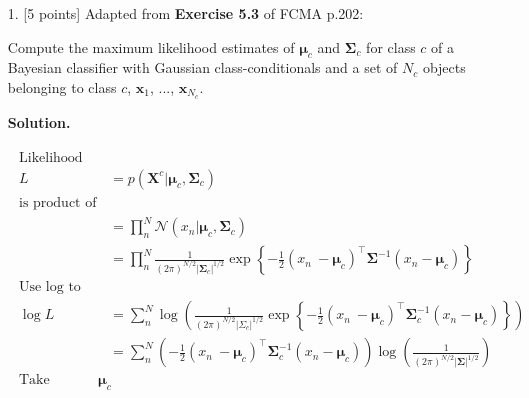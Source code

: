 \documentclass[10pt]{article}
\begin{document}
\newpage
\begin{itemize}

\item[1.]  [5 points]  %
Adapted from {\bf Exercise 5.3} of FCMA p.202:

Compute the maximum likelihood estimates of $\boldsymbol{\mu}_c$ and $\boldsymbol{\Sigma}_c$ for class $c$ of a Bayesian classifier with Gaussian class-conditionals and a set of $N_c$ objects belonging to class $c$, $\mathbf{x}_1$, ..., $\mathbf{x}_{N_c}$. 

{\bf Solution.} 

\begin{eqnarray*}
\begin{aligned}
\text{Likelihood}
\\
L &= p(\mathbf{X}^c|\boldsymbol{\mu}_c, \boldsymbol{\Sigma}_c)
\\
\text{is product of (Gaussian) probabilities}
\\
&= \prod_n^N \mathcal{N} (x_n|\boldsymbol{\mu}_c, \boldsymbol{\Sigma}_c)
\\
&= \prod_n^N 
\frac{1}{(2 \pi)^{N/2} | \boldsymbol {\Sigma}_c |^{1/2}} 
\exp 
\left\{ 
-\frac{1}{2} (x_n\ - \boldsymbol {\mu}_c)^\top \boldsymbol \Sigma^{-1} (x_n - \boldsymbol {\mu}_c)
\right\}
\\
\text{Use log to handle product}
\\
\log L &= \sum_n^N 
\log \left(
\frac{1}{(2 \pi)^{N/2} | {\Sigma}_c |^{1/2}} 
\exp 
\left\{ -\frac{1}{2} (x_n\ - \boldsymbol {\mu}_c)^\top \boldsymbol {\Sigma}_c^{-1} (x_n - \boldsymbol {\mu}_c) \right\}
\right)
\\
&= \sum_n^N
\left( -\frac{1}{2} (x_n\ - \boldsymbol {\mu}_c)^\top \boldsymbol {\Sigma}_c^{-1} (x_n - \boldsymbol {\mu}_c) \right)
\log \left( \frac{1}{(2 \pi)^{N/2} | \boldsymbol \Sigma |^{1/2}} \right)
\\
\text{Take derivative w.r.t. $\boldsymbol \mu_c$}
\\

\end{aligned}
\end{eqnarray*}
\end{itemize}
\end{document}

